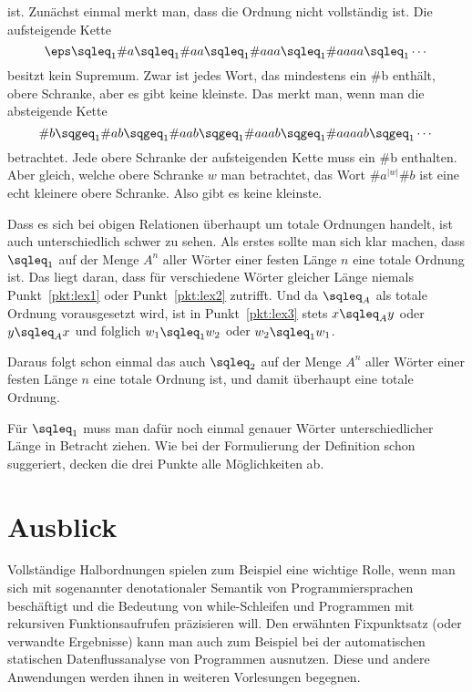 ist. Zunächst einmal merkt man, dass die Ordnung nicht vollständig
ist. Die aufsteigende Kette
\[
\eps \sqleq_1 \#{a} \sqleq_1 \#{aa} \sqleq_1 \#{aaa} \sqleq_1 \#{aaaa} \sqleq_1 \cdots
\]
besitzt kein Supremum. Zwar ist jedes Wort, das mindestens ein \#b
enthält, obere Schranke, aber es gibt keine kleinste. Das merkt man,
wenn man die absteigende Kette
\[
\#b \sqgeq_1 \#{ab}\sqgeq_1 \#{aab}\sqgeq_1 \#{aaab}\sqgeq_1 \#{aaaab}\sqgeq_1 \cdots
\]
betrachtet. Jede obere Schranke der aufsteigenden Kette muss ein \#b
enthalten. Aber gleich, welche obere Schranke $w$ man betrachtet, das
Wort $\#a^{|w|}\#b$ ist eine echt kleinere obere Schranke. Also gibt es
keine kleinste.

Dass es sich bei obigen Relationen überhaupt um totale Ordnungen
handelt, ist auch unterschiedlich schwer zu sehen. Als erstes sollte
man sich klar machen, dass $\sqleq_1$ auf der Menge $A^n$ aller Wörter
einer festen Länge $n$ eine totale Ordnung ist. Das liegt daran, dass
für verschiedene Wörter gleicher Länge niemals Punkt~\ref{pkt:lex1}
oder Punkt~\ref{pkt:lex2} zutrifft. Und da $\sqleq_A$ als totale
Ordnung vorausgesetzt wird, ist in Punkt~\ref{pkt:lex3} stets
$x\sqleq_A y$ oder $y\sqleq_A x$ und folglich $w_1\sqleq_1 w_2$ oder
$w_2\sqleq_1 w_1$.

Daraus folgt schon einmal das auch $\sqleq_2$ auf der Menge $A^n$
aller Wörter einer festen Länge $n$ eine totale Ordnung ist, und damit
überhaupt eine totale Ordnung.

Für $\sqleq_1$ muss man dafür noch einmal genauer Wörter
unterschiedlicher Länge in Betracht ziehen. Wie bei der Formulierung
der Definition schon suggeriert, decken die drei Punkte alle
Möglichkeiten ab.

\section{Ausblick}

Vollständige Halbordnungen spielen zum Beispiel eine wichtige Rolle,
wenn man sich mit sogenannter denotationaler Semantik von
Programmiersprachen beschäftigt und die Bedeutung von while-Schleifen
und Programmen mit rekursiven Funktionsaufrufen präzisieren will. Den
erwähnten Fixpunktsatz (oder verwandte Ergebnisse) kann man auch zum
Beispiel bei der automatischen statischen Datenflussanalyse von
Programmen ausnutzen. Diese und andere Anwendungen werden ihnen in
weiteren Vorlesungen begegnen.

\cleardoublepage

